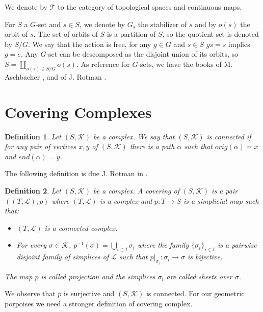 \documentclass{amsart}
\newtheorem{definition}{Definition}[section]
\begin{document}
We  denote by $\mathcal{T}$ to the category of topological spaces and continuous maps.

For $S$ a $G$-set and $s\in S$, we denote by $G_s$ the stabilizer of $s$ and  by $o(s)$ the orbit of $s$. The set of orbits of $S$ is a partition of $S$, so the quotient set is denoted by $S/G$. We say that the action is free, for any $g\in G$ and $s\in S$ $gs=s$ implies $g=e$. Any $G$-set can be descomposed as the disjoint union of its orbits, so $S=\coprod_{o(s)\in S/G}o(s)$. As reference for $G$-sets, we have the books of M. Aschbacher \cite{aschbacher2000finite}, and of J. Rotman \cite{rotman2012introduction}.



\section{Covering Complexes}


\begin{definition}
Let $(S,\mathcal{K})$ be a complex. We say that $(S,\mathcal{K})$ is connected if for any pair of vertices $x,y$ of $(S,\mathcal{K})$ there is a path $\alpha$ such that $orig(\alpha)=x$ and $end(\alpha)=y$.
\end{definition}

The following definition is due J. Rotman in \cite{rotman1973covering}.

\begin{definition}
Let $(S,\mathcal{K})$ be a complex. A covering of $(S,\mathcal{K})$ is a pair $((T,\mathcal{L}),p)$ where $(T,\mathcal{L})$ is a complex and $p\colon T\longrightarrow S$ is a simplicial map such that:
\begin{itemize}
\item $(T,\mathcal{L})$ is a connected complex.
\item For every $\sigma\in\mathcal{K}$, $p^{-1}(\sigma)=\bigcup_{i\in I}\sigma_i$ where the family $\{\sigma_i\}_{i\in I}$ is a pairwise disjoint family of simplices of $\mathcal{L}$ such that $p|_{\sigma_i}\colon \sigma_i\longrightarrow \sigma$ is bijective.
\end{itemize}
The map $p$ is called projection and the simplices $\sigma_i$ are called sheets over $\sigma$.
\end{definition}

We observe that $p$ is surjective and $(S,\mathcal{K})$ is connected. For our geometric porpoises we need a stronger definition of covering complex.
\end{document}
